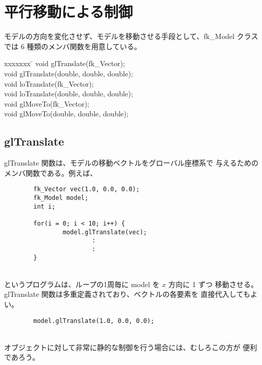 \section{平行移動による制御}
モデルの方向を変化させず、モデルを移動させる手段として、fk\_Model クラス
では 6 種類のメンバ関数を用意している。
\begin{bf}
\begin{tabbing}
xxxxxxx \= \kill
\> void glTranslate(fk\_Vector); \\
\> void glTranslate(double, double, double); \\
\> void loTranslate(fk\_Vector); \\
\> void loTranslate(double, double, double); \\
\> void glMoveTo(fk\_Vector); \\
\> void glMoveTo(double, double, double); \\
\end{tabbing}
\end{bf}
\subsection{glTranslate}
glTranslate 関数は、モデルの移動ベクトルをグローバル座標系で
与えるためのメンバ関数である。例えば、
\\
\begin{breakbox}
\begin{verbatim}
        fk_Vector vec(1.0, 0.0, 0.0);
        fk_Model model;
        int i;

        for(i = 0; i < 10; i++) {
                model.glTranslate(vec);
                        :
                        :
        }
\end{verbatim}
\end{breakbox}
~ \\
というプログラムは、ループの1周毎に model を \(x\) 方向に 1 ずつ
移動させる。glTranslate 関数は多重定義されており、ベクトルの各要素を
直接代入してもよい。
\\
\begin{screen}
\begin{verbatim}
        model.glTranslate(1.0, 0.0, 0.0);
\end{verbatim}
\end{screen}
~ \\
オブジェクトに対して非常に静的な制御を行う場合には、むしろこの方が
便利であろう。
